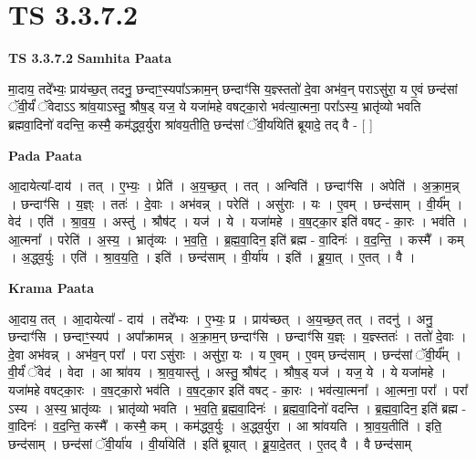 \documentclass[17pt]{extarticle}
\begin{document}
\section{ TS 3.3.7.2 }

\textbf{TS 3.3.7.2 } \newline
\textbf{Samhita Paata} \newline

मा॒दाय॒ तदे᳚भ्यः॒ प्राय॑च्छ॒त् तदनु॒ छन्दाꣳ॒॒स्यपा᳚ऽक्राम॒न् छन्दाꣳ॑सि य॒ज्ञ्स्ततो॑ दे॒वा अभ॑व॒न् पराऽसु॑रा॒ य ए॒वं छन्द॑सां ॅवी॒र्यं॑ ॅवेदाऽऽ श्रा॑व॒याऽस्तु॒ श्रौष॒ड् यज॒ ये यजा॑महे वषट्का॒रो भव॑त्या॒त्मना॒ परा᳚ऽस्य॒ भ्रातृ॑व्यो भवति ब्रह्मवा॒दिनो॑ वदन्ति॒ कस्मै॒ कम॑द्ध्व॒र्युरा श्रा॑वय॒तीति॒ छन्द॑सां ॅवी॒र्या॑येति॑ ब्रूयादे॒ तद् वै - [  ] \newline

\textbf{Pada Paata} \newline

आ॒दायेत्या᳚-दाय॑ । तत् । ए॒भ्यः॒ । प्रेति॑ । अ॒य॒च्छ॒त् । तत् । अन्विति॑ । छन्दाꣳ॑सि । अपेति॑ । अ॒क्रा॒म॒न्न् । छन्दाꣳ॑सि । य॒ज्ञ्ः । ततः॑ । दे॒वाः । अभ॑वन्न् । परेति॑ । असु॑राः । यः । ए॒वम् । छन्द॑साम् । वी॒र्य᳚म् । वेद॑ । एति॑ । श्रा॒व॒य॒ । अस्तु॑ । श्रौष॑ट् । यज॑ । ये । यजा॑महे । व॒ष॒ट्का॒र इति॑ वषट् - का॒रः । भव॑ति । आ॒त्मना᳚ । परेति॑ । अ॒स्य॒ । भ्रातृ॑व्यः । भ॒व॒ति॒ । ब्र॒ह्म॒वा॒दिन॒ इति॑ ब्रह्म - वा॒दिनः॑ । व॒द॒न्ति॒ । कस्मै᳚ । कम् । अ॒द्ध्व॒र्युः । एति॑ । श्रा॒व॒य॒ति॒ । इति॑ । छन्द॑साम् । वी॒र्या॑य । इति॑ । ब्रू॒या॒त् । ए॒तत् । वै ।  \newline


\textbf{Krama Paata} \newline

आ॒दाय॒ तत् । आ॒दायेत्या᳚ - दाय॑ । तदे᳚भ्यः । ए॒भ्यः॒ प्र । प्राय॑च्छत् । अ॒य॒च्छ॒त् तत् । तदनु॑ । अनु॒ छन्दाꣳ॑सि । छन्दाꣳ॒॒स्यप॑ । अपा᳚क्रामन्न् । अ॒क्रा॒म॒न् छन्दाꣳ॑सि । छन्दाꣳ॑सि य॒ज्ञ्ः । य॒ज्ञ्स्ततः॑ । ततो॑ दे॒वाः । दे॒वा अभ॑वन्न् । अभ॑व॒न् परा᳚ । परा ऽसु॑राः । असु॑रा॒ यः । य ए॒वम् । ए॒वम् छन्द॑साम् । छन्द॑सां ॅवी॒र्य᳚म् । वी॒र्यं॑ ॅवेद॑ । वेदा । आ श्रा॑वय । श्रा॒व॒यास्तु॑ । अस्तु॒ श्रौष॑ट् । श्रौष॒ड् यज॑ । यज॒ ये । ये यजा॑महे । यजा॑महे वषट्का॒रः । व॒ष॒ट्का॒रो भव॑ति । व॒ष॒ट्का॒र इति॑ वषट् - का॒रः । भव॑त्या॒त्मना᳚ । आ॒त्मना॒ परा᳚ । परा᳚ ऽस्य । अ॒स्य॒ भ्रातृ॑व्यः । भ्रातृ॑व्यो भवति । भ॒व॒ति॒ ब्र॒ह्म॒वा॒दिनः॑ । ब्र॒ह्म॒वा॒दिनो॑ वदन्ति । ब्र॒ह्म॒वा॒दिन॒ इति॑ ब्रह्म - वा॒दिनः॑ । व॒द॒न्ति॒ कस्मै᳚ । कस्मै॒ कम् । कम॑द्ध्व॒र्युः । अ॒द्ध्व॒र्युरा । आ श्रा॑वयति । श्रा॒व॒य॒तीति॑ । इति॒ छन्द॑साम् । छन्द॑सां ॅवी॒र्या॑य । वी॒र्या॑येति॑ । इति॑ ब्रूयात् । ब्रू॒या॒दे॒तत् । ए॒तद् वै । वै छन्द॑साम् \newline
\end{document}
